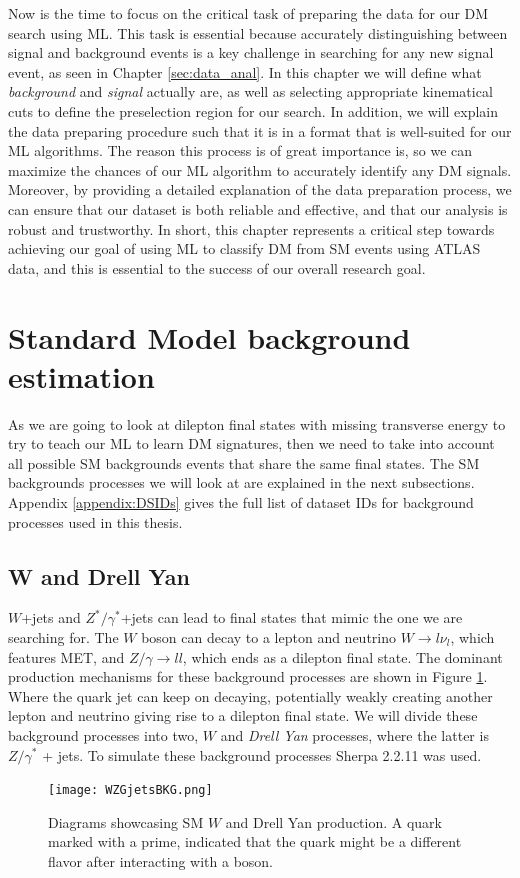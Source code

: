 \documentclass[12pt, a4paper]{book}
\begin{document}
Now is the time to focus on the critical task of preparing the data for our DM search using ML. This task is essential because accurately distinguishing between signal and background events is a key challenge in searching for any new signal event, 
as seen in Chapter \ref{sec:data_anal}. In this chapter we will define what \textit{background} and \textit{signal} actually are, as well as selecting appropriate kinematical cuts to define the preselection region for our search. In addition, we will 
explain the data preparing procedure such that it is in a format that is well-suited for our ML algorithms. The reason this process is of great importance is, so we can maximize the chances of our ML algorithm to accurately identify any DM signals. 
Moreover, by providing a detailed explanation of the data preparation process, we can ensure that our dataset is both reliable and effective, and that our analysis is robust and trustworthy. In short, this chapter represents a critical step towards 
achieving our goal of using ML to classify DM from SM events using ATLAS data, and this is essential to the success of our overall research goal.



\clearpage
\section{Standard Model background estimation}\label{sec:SM_bkgs}
As we are going to look at dilepton final states with missing transverse energy to try to teach our ML to learn DM signatures, then we need to take into account all possible SM backgrounds events that share the same final states. The SM backgrounds processes we will look at are explained in the next subsections. 
Appendix \ref{appendix:DSIDs} gives the full list of dataset IDs for background processes used in this thesis.

\subsection{W and Drell Yan}
$W$+jets and $Z^*/\gamma^*$+jets can lead to final states that mimic the one we are searching for. The $W$ boson can decay to a lepton and neutrino $W\rightarrow l\nu_l$, which features MET, and $Z/\gamma\rightarrow ll$, which ends as a dilepton final state. 
The dominant production mechanisms for these background processes are shown in Figure \ref{fig:WZG_BKG}. Where the quark jet can keep on decaying, potentially weakly creating another lepton and neutrino giving rise to a dilepton final state. We will divide these background processes into two, $W$ and \textit{Drell Yan} processes, where the latter is $Z/\gamma^*$ + jets. To simulate these background processes Sherpa 2.2.11 \cite{Sherpa} was used.
\graphicspath{{../../figures/}}
\begin{figure}[!ht]
    \centering
    \texttt{[image: WZGjetsBKG.png]}
    \caption[$W$ and Drell Yan production]{Diagrams showcasing SM $W$ and Drell Yan production. A quark marked with a prime, indicated that the quark might be a different flavor after interacting with a boson.}\label{fig:WZG_BKG}
\end{figure}
\end{document}
